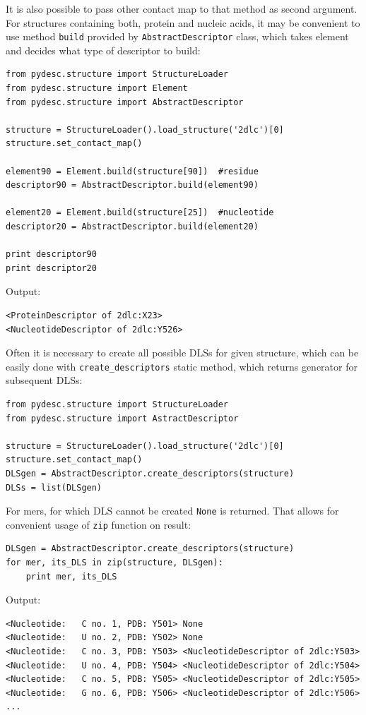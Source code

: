 \documentclass{article}
\begin{document}
It is also possible to pass other contact map to that method as second argument. For structures containing both, protein and nucleic acids, it may be convenient to use method \texttt{build} provided by \texttt{AbstractDescriptor} class, which takes element and decides what type of descriptor to build:

\begin{lstlisting}
from pydesc.structure import StructureLoader
from pydesc.structure import Element
from pydesc.structure import AbstractDescriptor

structure = StructureLoader().load_structure('2dlc')[0]
structure.set_contact_map()

element90 = Element.build(structure[90])  #residue
descriptor90 = AbstractDescriptor.build(element90)

element20 = Element.build(structure[25])  #nucleotide
descriptor20 = AbstractDescriptor.build(element20)

print descriptor90
print descriptor20
\end{lstlisting}
Output:
\begin{lstlisting}
<ProteinDescriptor of 2dlc:X23>
<NucleotideDescriptor of 2dlc:Y526>
\end{lstlisting}

Often it is necessary to create all possible DLSs for given structure, which can be easily done with \texttt{create\_{}descriptors} static method, which returns generator for subsequent DLSs:

\begin{lstlisting}
from pydesc.structure import StructureLoader
from pydesc.structure import AstractDescriptor

structure = StructureLoader().load_structure('2dlc')[0]
structure.set_contact_map()
DLSgen = AbstractDescriptor.create_descriptors(structure)
DLSs = list(DLSgen)
\end{lstlisting}

For mers, for which DLS cannot be created \texttt{None} is returned. That allows for convenient usage of \texttt{zip} function on result:

\begin{lstlisting}
DLSgen = AbstractDescriptor.create_descriptors(structure)
for mer, its_DLS in zip(structure, DLSgen):
    print mer, its_DLS
\end{lstlisting}
Output:
\begin{lstlisting}
<Nucleotide:   C no. 1, PDB: Y501> None
<Nucleotide:   U no. 2, PDB: Y502> None
<Nucleotide:   C no. 3, PDB: Y503> <NucleotideDescriptor of 2dlc:Y503>
<Nucleotide:   U no. 4, PDB: Y504> <NucleotideDescriptor of 2dlc:Y504>
<Nucleotide:   C no. 5, PDB: Y505> <NucleotideDescriptor of 2dlc:Y505>
<Nucleotide:   G no. 6, PDB: Y506> <NucleotideDescriptor of 2dlc:Y506>
...
\end{lstlisting}
\end{document}
